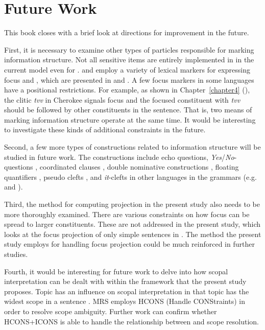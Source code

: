 \section{Future Work}
\label{15:sec:future}

This book closes with a brief look at directions for
improvement in the future. 



First, it is necessary to examine other types of particles responsible
for marking information structure.  Not all  sensitive items are
entirely implemented in  in the current model even for
.  and  employ a
variety of lexical markers for expressing focus and , which are
presented in \citet{hasegawa:11} and \citet{lee:04}. A few focus
markers in some languages have a positional restrictions. For example,
as shown in Chapter~\ref{chapter4} (), the clitic
\textit{tvv} in Cherokee signals focus and the focused constituent
with \textit{tvv} should be followed by other constituents in the
sentence. That is, two means of marking information structure operate
at the same time.  It would be interesting to investigate these kinds
of additional constraints in the future.


Second, a few more types of constructions related to information
structure will be studied in future work.  The constructions include
echo questions, \textit{Yes}/\textit{No}-questions \citep{king:95},
coordinated clauses \citep{heycock:07}, double nominative
constructions \citep{kim:sells:07,choi:12}, floating quantifiers
\citep{yoshimoto:etal:06,kim:11b}, pseudo clefts
\citep{kim:07}, and \textit{it}-clefts in other languages
in the  grammars (e.g.\ 
\citep{hiraiwa:ishihara:02,kizu:05} and 
\citep{kim:yang:09}).


Third, the method for computing  projection
in the present study also needs to be more thoroughly examined. There
are various constraints on how focus can be spread to larger
constituents. These are not addressed in the present study, which
looks at the focus projection of only simple sentences in . The
method the present study employs for handling focus projection could be much
reinforced in further studies.


Fourth, it would be interesting for future work to delve into how
scopal interpretation can be dealt with within the framework that the
present study proposes.  Topic has an influence on scopal
interpretation in that topic has the widest scope in a sentence
\citep{buring:97,portner:yabushita:98,erteschik:07}.  MRS employs
HCONS (Handle CONStraints) in order to resolve scope
ambiguity. Further work can confirm whether HCONS+ICONS is
able to handle the relationship between  and scope resolution.


